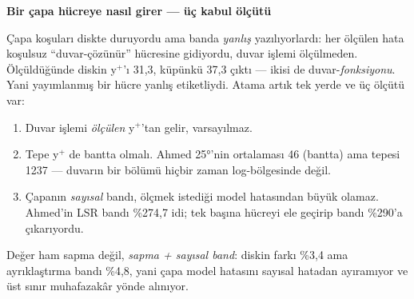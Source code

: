 \documentclass[11pt,a4paper]{article}
\newcommand{\kkkenar}{lacivert}
\newcommand{\kkzemin}{kod}
\newenvironment{renkkutu}[3]{%
  \renewcommand{\kkkenar}{#1}\renewcommand{\kkzemin}{#2}%
  \par\medskip\noindent
  \begin{lrbox}{\kutugovde}%
  \begin{minipage}{\dimexpr\linewidth-2\fboxsep-2\fboxrule\relax}\footnotesize
  \textcolor{#1}{\textbf{#3}}\par\vspace{3pt}%
}{%
  \end{minipage}%
  \end{lrbox}%
  \noindent\fcolorbox{\kkkenar}{\kkzemin}{\usebox{\kutugovde}}%
  \par\medskip
}
\newenvironment{anafikir}[1]{\begin{renkkutu}{lacivert}{kod}{#1}}{\end{renkkutu}}
\begin{document}
\begin{anafikir}{Bir çapa hücreye nasıl girer --- üç kabul ölçütü}
Çapa koşuları diskte duruyordu ama banda \emph{yanlış} yazılıyorlardı: her
ölçülen hata koşulsuz ``duvar-çözünür'' hücresine gidiyordu, duvar işlemi
ölçülmeden. Ölçüldüğünde diskin y$^+$'ı 31{,}3, küpünkü 37{,}3 çıktı --- ikisi
de duvar-\emph{fonksiyonu}. Yani yayımlanmış bir hücre yanlış etiketliydi.
Atama artık tek yerde ve üç ölçütü var:

\begin{enumerate}\setlength\itemsep{1pt}
  \item Duvar işlemi \emph{ölçülen} y$^+$'tan gelir, varsayılmaz.
  \item Tepe y$^+$ de bantta olmalı. Ahmed 25°'nin ortalaması 46 (bantta) ama
        tepesi 1237 --- duvarın bir bölümü hiçbir zaman log-bölgesinde değil.
  \item Çapanın \emph{sayısal} bandı, ölçmek istediği model hatasından büyük
        olamaz. Ahmed'in LSR bandı \%274{,}7 idi; tek başına hücreyi ele geçirip
        bandı \%290'a çıkarıyordu.
\end{enumerate}

\noindent Değer ham sapma değil, \emph{sapma + sayısal band}: diskin farkı
\%3{,}4 ama ayrıklaştırma bandı \%4{,}8, yani çapa model hatasını sayısal
hatadan ayıramıyor ve üst sınır muhafazakâr yönde alınıyor.
\end{anafikir}
\end{document}
